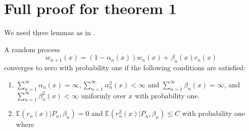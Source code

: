 \section{Full proof for theorem 1}

We need three lemmas as in \cite{jaakkola1993convergence}.

\begin{lemma}
A random process 
$$
w_{n+1}(x) = (1-\alpha_n(x))w_n(x)+\beta_n(x)r_n(x)
$$
converges to zero with probability one if the following conditions are satisfied:
\begin{enumerate}
    \item $\sum_{n=1}^\infty \alpha_n(x) = \infty, \sum_{n=1}^\infty \alpha_n^2(x)<\infty$ and $\sum_{n=1}^\infty \beta_n(x) = \infty$, and $\sum_{n=1}^\infty \beta_n^2(x)<\infty$ uniformly over $x$ with probability one.
    \item $\mathbb{E}(r_n(x)|P_n,\beta_n) = 0$ and $\mathbb{E}(r_n^2(x)|P_n,\beta_n)\le C$ with probability one where
\end{enumerate}
    
\end{lemma}